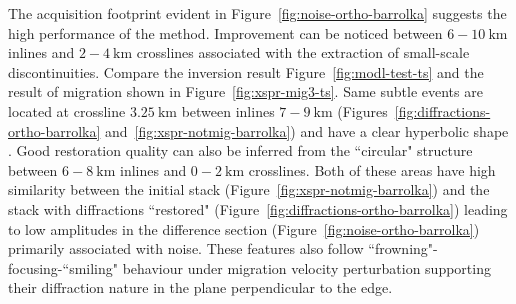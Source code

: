 The acquisition footprint evident in Figure~\ref{fig:noise-ortho-barrolka} suggests the
high performance of the method. Improvement can be noticed between $6-10\ \text{km}$ inlines and $2-4\ \text{km}$ crosslines associated
with the extraction of small-scale discontinuities. Compare the inversion result Figure~\ref{fig:modl-test-ts}
and the result of migration shown in Figure~\ref{fig:xspr-mig3-ts}. Same subtle events are located at crossline $3.25\ \text{km}$ between inlines $7-9\ \text{km}$
(Figures~\ref{fig:diffractions-ortho-barrolka} and~\ref{fig:xspr-notmig-barrolka}) and have a clear hyperbolic shape
.
Good restoration quality can also be inferred from the ``circular" structure
between $6-8\ \text{km}$ inlines and $0-2\ \text{km}$ crosslines. Both of these areas
have high similarity between the initial  stack (Figure~\ref{fig:xspr-notmig-barrolka}) and the stack with diffractions ``restored" (Figure~\ref{fig:diffractions-ortho-barrolka})
leading to low amplitudes in the difference section (Figure~\ref{fig:noise-ortho-barrolka}) primarily associated with noise. These features also follow ``frowning"-focusing-``smiling"
behaviour under migration velocity perturbation supporting their diffraction nature in the plane perpendicular to the edge.





